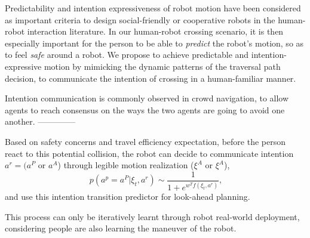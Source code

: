 \documentclass[conference]{IEEEtran}
\begin{document}

Predictability and intention expressiveness of robot motion have been considered 
as important criteria to design social-friendly or cooperative robots in 
the human-robot interaction literature. In our human-robot crossing scenario, 
it is then especially important for the person to be able to \textit{predict} 
the robot's motion, so as to feel \textit{safe} around a robot.
We  propose to achieve predictable and 
intention-expressive motion by mimicking the dynamic patterns of the
traversal path decision, to communicate the intention of crossing in a 
human-familiar manner.


Intention communication is commonly observed in crowd navigation, to allow agents to reach 
consensus on the ways the two agents are going to avoid one another. 
--------------

Based on safety concerns and travel efficiency expectation, before the person 
react to this potential collision, the robot can 
decide to communicate intention $a^r= (a^P$ or $a^A$) through legible motion 
realization ($\xi^A$ or $\xi^A$),
\begin{equation}~\label{eq:transition}
p(a^p=a^P|\xi_t, a^r) \sim \frac{1}{1+e^{w^Tf(\xi_t,a^r)}},
\end{equation}
and use this intention transition predictor for look-ahead planning.

This process can only be iteratively learnt through robot real-world 
deployment, considering people are also learning the maneuver of the robot.
\end{document}
